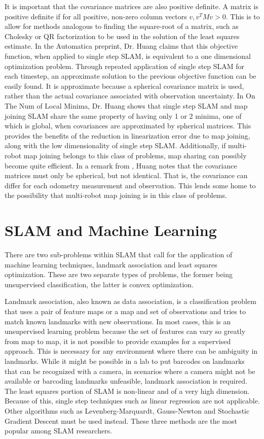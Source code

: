 \documentclass[12pt]{report}
\begin{document}
It is important that the covariance matrices are also positive definite.  A matrix is positive definite if for all positive, non-zero column vectors $v, v^T Mv > 0$. This is to allow for methods analogous to finding the square-root of a matrix, such as Cholesky or QR factorization to be used in the solution of the least squares estimate. 
In the Automatica preprint, Dr. Huang claims that this objective function, when applied to single step SLAM, is equivalent to a one dimensional optimization problem.  Through repeated application of single step SLAM for each timestep, an approximate solution to the previous objective function can be easily found.  It is approximate because a spherical covariance matrix is used, rather than the actual covariance associated with observation uncertainty.
In On The Num of Local Minima, Dr. Huang shows that single step SLAM and map joining SLAM share the same property of having only 1 or 2 minima, one of which is global, when covariances are approximated by spherical matrices.  This provides the benefits of the reduction in linearization error due to map joining, along with the low dimensionality of single step SLAM.  Additionally, if multi-robot map joining belongs to this class of problems, map sharing can possibly become quite efficient.
In a remark from \cite{onthenumber}, Huang notes that the covariance matrices must only be spherical, but not identical.  That is, the covariance can differ for each odometry measurement and observation.  This lends some home to the possibility that multi-robot map joining is in this class of problems.

\section{SLAM and Machine Learning}

	There are two sub-problems within SLAM that call for the application of machine learning techniques, landmark association and least squares optimization.  These are two separate types of problems, the former being unsupervised classification, the latter is convex optimization.

Landmark association, also known as data association, is a classification problem that uses a pair of feature maps or a map and set of observations and tries to match known landmarks with new observations.  In most cases, this is an unsupervised learning problem because the set of features can vary so greatly from map to map, it is not possible to provide examples for a supervised approach.  This is necessary for any environment where there can be ambiguity in landmarks.  While it might be possible in a lab to put barcodes on landmarks that can be recognized with a camera, in scenarios where a camera might not be available or barcoding landmarks unfeasible, landmark association is required.
The least squares portion of SLAM is non-linear and of a very high dimension.  Because of this, single step techniques such as linear regression are not applicable.  Other algorithms such as Levenberg-Marquardt, Gauss-Newton and Stochastic Gradient Descent must be used instead.  These three methods are the most popular among SLAM researchers.  
\end{document}
